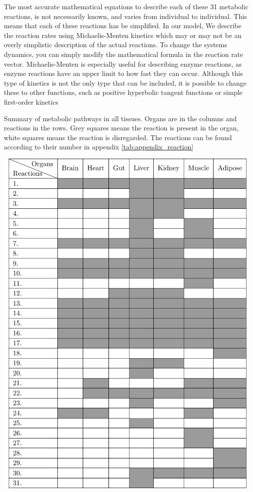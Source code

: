 \documentclass{IEEEtran}
\begin{document}
The most accurate mathematical equations to describe each of these 31 metabolic reactions, is not necessarily known, and varies from individual to individual. This means that each of these reactions has be simplified. In our model, We describe the reaction rates using Michaelis-Menten kinetics which may or may not be an overly simplistic description of the actual reactions. To change the systems dynamics, you can simply modify the mathematical formula in the reaction rate vector. Michaelis-Menten is especially useful for describing enzyme reactions, as enzyme reactions have an upper limit to how fast they can occur. Although this type of kinetics is not the only type that can be included, it is possible to change these to other functions, such as positive hyperbolic tangent functions \cite{sorensen_1978} or simple first-order kinetics \cite{kim_saidel_cabrera_2006}\\


\vfill\eject


\begin{table}[H]
    \centering
    \caption{Summary of metabolic pathways in all tissues. Organs are in the columns and reactions in the rows. Grey squares means the reaction is present in the organ, white squares means the reaction is disregarded. The reactions can be found according to their number in appendix \ref{tab:appendix_reaction}}
    \label{tab:summary_pathways}
    \includegraphics[width=\columnwidth]{Diagrams/artikel_tabel_II.pdf}
\end{table}
\end{document}
